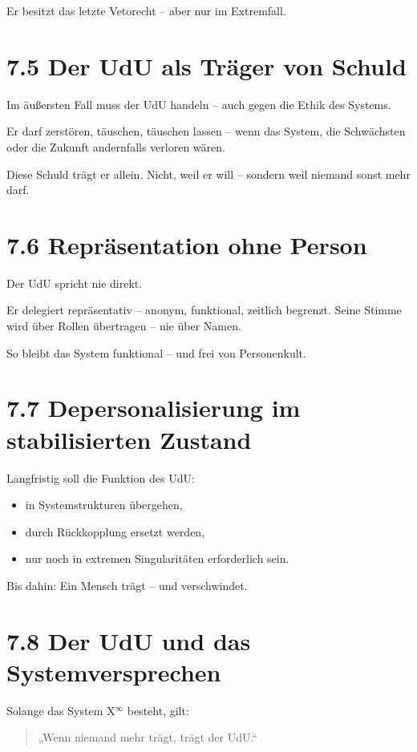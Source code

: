 \documentclass[12pt,a4paper]{book}
\begin{document}
Er besitzt das letzte Vetorecht – aber nur im Extremfall.

\section*{7.5 Der UdU als Träger von Schuld}

Im äußersten Fall muss der UdU handeln – auch gegen die Ethik des Systems.

Er darf zerstören, täuschen, täuschen lassen –  
wenn das System, die Schwächsten oder die Zukunft andernfalls verloren wären.

Diese Schuld trägt er allein.  
Nicht, weil er will – sondern weil niemand sonst mehr darf.

\section*{7.6 Repräsentation ohne Person}

Der UdU spricht nie direkt.

Er delegiert repräsentativ – anonym, funktional, zeitlich begrenzt.  
Seine Stimme wird über Rollen übertragen – nie über Namen.

So bleibt das System funktional – und frei von Personenkult.

\section*{7.7 Depersonalisierung im stabilisierten Zustand}

Langfristig soll die Funktion des UdU:

\begin{itemize}
    \item in Systemstrukturen übergehen,
    \item durch Rückkopplung ersetzt werden,
    \item nur noch in extremen Singularitäten erforderlich sein.
\end{itemize}

Bis dahin:  
Ein Mensch trägt – und verschwindet.

\section*{7.8 Der UdU und das Systemversprechen}

Solange das System X$^\infty$ besteht, gilt:

\begin{quote}
„Wenn niemand mehr trägt, trägt der UdU.“  
\end{quote}
\end{document}
